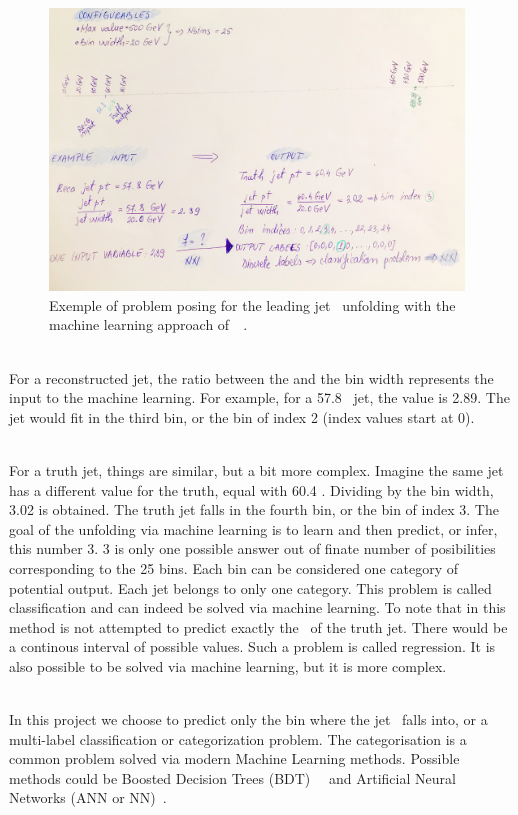 \begin{figure}[h]
  \centering
  \includegraphics[width=0.98\textwidth]{../presentation/plots/PhysicsProblem.jpg}
  \caption{Exemple of problem posing for the leading jet \pt~unfolding with the machine learning approach of~\cite{AGlazov}~\cite{AGlazovCode}.}
  \label{fig:PhysicsProblem}
\end{figure}

\ \\For a reconstructed jet, the ratio between the \pt and the bin width represents the input to the machine learning. For example, for a 57.8 \GeV~jet, the value is 2.89. The jet would fit in the third bin, or the bin of index 2 (index values start at 0).

\ \\For a truth jet, things are similar, but a bit more complex. Imagine the same jet has a different value for the truth, equal with 60.4 \GeV. Dividing by the bin width, 3.02 is obtained. The truth jet falls in the fourth bin, or the bin of index 3. The goal of the unfolding via machine learning is to learn and then predict, or infer, this number 3. 3 is only one possible answer out of finate number of posibilities corresponding to the 25 bins. Each bin can be considered one category of potential output. Each jet belongs to only one category. This problem is called classification and can indeed be solved via machine learning. To note that in this method is not attempted to predict exactly the \pt~of the truth jet. There would be a continous interval of possible values. Such a problem is called regression. It is also possible to be solved via machine learning, but it is more complex. 

\ \\In this project we choose to predict only the bin where the jet \pt~falls into, or a multi-label classification or categorization problem. The categorisation is a common problem solved via modern Machine Learning methods. Possible methods could be Boosted Decision Trees (BDT)~\cite{JoshuaBendavid}~\cite{AndrewNg} and Artificial Neural Networks (ANN or NN)~\cite{AndrewNg}. 

